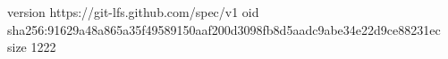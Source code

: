 version https://git-lfs.github.com/spec/v1
oid sha256:91629a48a865a35f49589150aaf200d3098fb8d5aadc9abe34e22d9ce88231ec
size 1222
